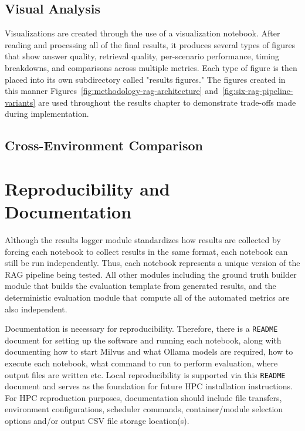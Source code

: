 \subsection{Visual Analysis}
Visualizations are created through the use of a visualization notebook. After reading and processing all of the final results, it produces several types of figures that show answer quality, retrieval quality, per-scenario performance, timing breakdowns, and comparisons across multiple metrics. Each type of figure is then placed into its own subdirectory called "results figures." The figures created in this manner Figures~\ref{fig:methodology-rag-architecture} and~\ref{fig:six-rag-pipeline-variants} are used throughout the results chapter to demonstrate trade-offs made during implementation.

\subsection{Cross-Environment Comparison}


\section{Reproducibility and Documentation}
Although the results logger module standardizes how results are collected by forcing each notebook to collect results in the same format, each notebook can still be run independently. Thus, each notebook represents a unique version of the RAG pipeline being tested. All other modules including the ground truth builder module that builds the evaluation template from generated results, and the deterministic evaluation module that compute all of the automated metrics are also independent.

Documentation is necessary for reproducibility. Therefore, there is a \texttt{README} document for setting up the software and running each notebook, along with documenting how to start Milvus and what Ollama models are required, how to execute each notebook, what command to run to perform evaluation, where output files are written etc. Local reproducibility is supported via this \texttt{README} document and serves as the foundation for future HPC installation instructions. For HPC reproduction purposes, documentation should include file transfers, environment configurations, scheduler commands, container/module selection options and/or output CSV file storage location(s).

